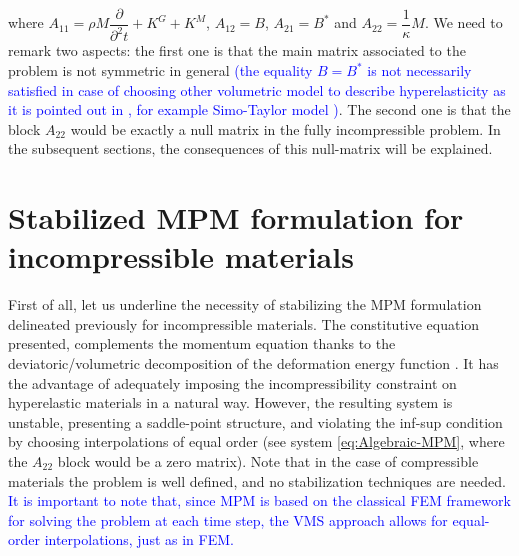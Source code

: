 \documentclass[11pt,english]{article}
\newcommand{\LM}[1]{\textcolor{blue}{#1}}
\begin{document}
where $A_{11}=\rho M\dfrac{\partial}{\partial^2 t}  + K^G + K ^M$,  $A_{12}=B $,   $A_{21}=B ^*$ and $A_{22}= \dfrac{1}{\kappa}M$.  We need to remark two aspects: the first one is that the main matrix associated to the problem is not symmetric in general \LM{(the equality $B = B^*$ is not necessarily satisfied in case of choosing other volumetric model to describe hyperelasticity as it is pointed out in \cite{castanar2020stabilized}, for example Simo-Taylor model \cite{simo1985variational})}. The second one is that the block $A_{22}$ would be exactly a null matrix in the fully incompressible problem. In the subsequent sections, the consequences of this null-matrix will be explained.


%
%

\section{Stabilized MPM formulation for incompressible materials}\label{sec:StabilizedFormulation}

First of all, let us underline the necessity of stabilizing the MPM formulation delineated previously for incompressible materials. The constitutive equation presented, complements the momentum equation thanks to the deviatoric/volumetric decomposition of the deformation energy function \cite{sansour2008physical}. It has the advantage of adequately imposing the incompressibility constraint on hyperelastic materials in a natural way. However, the resulting system is unstable, presenting a saddle-point structure, and violating the inf-sup condition by choosing interpolations of equal order (see system \eqref{eq:Algebraic-MPM}, where the $A_{22}$ block would be a zero matrix). Note that in the case of compressible materials the problem is well defined, and no stabilization techniques are needed. \LM{It is important to note that, since MPM is based on the classical FEM framework for solving the problem at each time step, the VMS approach allows for equal-order interpolations, just as in FEM.}
     
\end{document}
